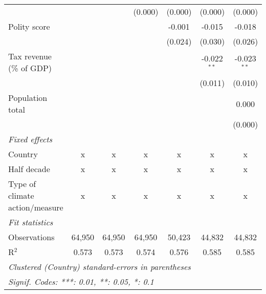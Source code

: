 \begin{tabular}{lcccccc}
                                                                                              &         &                & (0.000)        & (0.000)        & (0.000)        & (0.000)\\   
   Polity score                                                                               &         &                &                & -0.001         & -0.015         & -0.018\\   
                                                                                              &         &                &                & (0.024)        & (0.030)        & (0.026)\\   
   Tax revenue (\% of GDP)                                                                    &         &                &                &                & -0.022$^{**}$  & -0.023$^{**}$\\   
                                                                                              &         &                &                &                & (0.011)        & (0.010)\\   
   Population total                                                                           &         &                &                &                &                & 0.000\\   
                                                                                              &         &                &                &                &                & (0.000)\\   
   \emph{Fixed effects}\\
   Country                                                                                    & x       & x              & x              & x              & x              & x\\  
   Half decade                                                                                & x       & x              & x              & x              & x              & x\\  
   Type of climate action/measure                                                             & x       & x              & x              & x              & x              & x\\  
   \midrule \emph{Fit statistics}\\
   Observations                                                                               & 64,950  & 64,950         & 64,950         & 50,423         & 44,832         & 44,832\\  
   R$^2$                                                                                      & 0.573   & 0.573          & 0.574          & 0.576          & 0.585          & 0.585\\  
   \midrule
   \multicolumn{7}{l}{\emph{Clustered (Country) standard-errors in parentheses}}\\
   \multicolumn{7}{l}{\emph{Signif. Codes: ***: 0.01, **: 0.05, *: 0.1}}\\
\end{tabular}
\par\endgroup


